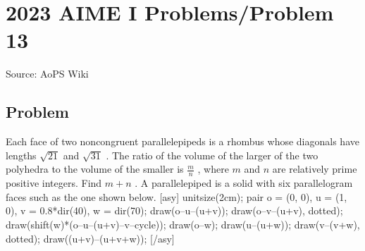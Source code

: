 \documentclass[12pt]{article}
\begin{document}
\section*{{2023 AIME I Problems/Problem 13}}
Source: AoPS Wiki

\subsection*{Problem}
Each face of two noncongruent parallelepipeds is a rhombus whose diagonals have lengths $\sqrt{21}$ and $\sqrt{31}$ .
The ratio of the volume of the larger of the two polyhedra to the volume of the smaller is $\frac{m}{n}$ , where $m$ and $n$ are relatively prime positive integers. Find $m + n$ . A parallelepiped is a solid with six parallelogram faces
such as the one shown below. [asy] unitsize(2cm); pair o = (0, 0), u = (1, 0), v = 0.8*dir(40), w = dir(70); draw(o--u--(u+v)); draw(o--v--(u+v), dotted); draw(shift(w)*(o--u--(u+v)--v--cycle)); draw(o--w); draw(u--(u+w)); draw(v--(v+w), dotted); draw((u+v)--(u+v+w)); [/asy]
\end{document}
